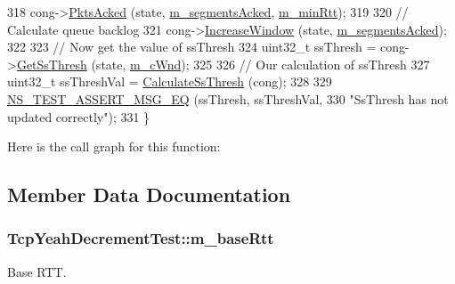 \begin{DoxyCode}
318   cong->\hyperlink{classns3_1_1TcpYeah_a2423d9c6a6aea3c8e58749c9219d2fbd}{PktsAcked} (state, \hyperlink{classTcpYeahDecrementTest_a781689c8f518fdfea31ecb3c7b7fafa2}{m\_segmentsAcked}, \hyperlink{classTcpYeahDecrementTest_a728d66615946db9e33dc926a6487a998}{m\_minRtt});
319 
320   \textcolor{comment}{// Calculate queue backlog}
321   cong->\hyperlink{classns3_1_1TcpYeah_aa1efa60adbcb1dfad8d188deef7ed2ea}{IncreaseWindow} (state, \hyperlink{classTcpYeahDecrementTest_a781689c8f518fdfea31ecb3c7b7fafa2}{m\_segmentsAcked});
322 
323   \textcolor{comment}{// Now get the value of ssThresh}
324   uint32\_t ssThresh = cong->\hyperlink{classns3_1_1TcpYeah_a08fe03bc4dca7f6c36f40ac770335c1a}{GetSsThresh} (state, \hyperlink{classTcpYeahDecrementTest_a51e21a89b0f5fcab90370db699a214e5}{m\_cWnd});
325 
326   \textcolor{comment}{// Our calculation of ssThresh}
327   uint32\_t ssThreshVal = \hyperlink{classTcpYeahDecrementTest_ac718766c0cb1a19751cf1e4ad88f7d85}{CalculateSsThresh} (cong);
328 
329   \hyperlink{group__testing_ga2a9d78cffb3db8e867c35fff0b698cf5}{NS\_TEST\_ASSERT\_MSG\_EQ} (ssThresh, ssThreshVal,
330                          \textcolor{stringliteral}{"SsThresh has not updated correctly"});
331 \}
\end{DoxyCode}


Here is the call graph for this function\+:




\subsection{Member Data Documentation}
\subsubsection[{\texorpdfstring{m\+\_\+base\+Rtt}{m_baseRtt}}]{ Tcp\+Yeah\+Decrement\+Test\+::m\+\_\+base\+Rtt\hspace{0.3cm}{\ttfamily [private]}}\hypertarget{classTcpYeahDecrementTest_a3086a8d8bda85c67c56b15b29d966334}{}\label{classTcpYeahDecrementTest_a3086a8d8bda85c67c56b15b29d966334}


Base R\+TT. 

